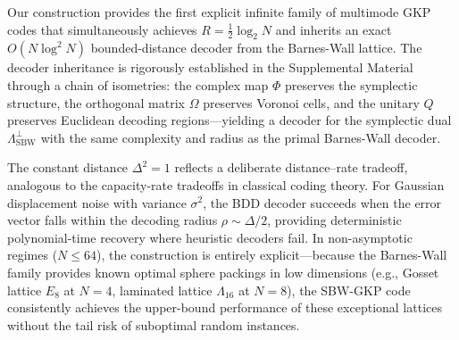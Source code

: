\documentclass[aps,prl,twocolumn,superscriptaddress]{revtex4-2}
\begin{document}
\begin{table}[t!]
\centering
\caption{Comparison of multimode GKP code families. The distance $\Delta^2$ is normalized such that $\Delta^2=1$ is the baseline GKP distance. $\Delta_{\max}^2$ denotes the asymptotic Minkowski capacity limit (Theorem~\ref{thm:minkowski}). $^\ast$For random constructions, bounded-distance decoding (BDD) restricts successful recovery to a vanishing fraction of the code distance~\cite{bloemer2026}.}
\label{tab:comparison}
\end{table}


Our construction provides the first explicit infinite family of multimode GKP codes that simultaneously achieves $R = \frac{1}{2}\log_2 N$ and inherits an exact $O(N\log^2 N)$ bounded-distance decoder from the Barnes-Wall lattice. The decoder inheritance is rigorously established in the Supplemental Material through a chain of isometries: the complex map $\Phi$ preserves the symplectic structure, the orthogonal matrix $\Omega$ preserves Voronoi cells, and the unitary $Q$ preserves Euclidean decoding regions---yielding a decoder for the symplectic dual $\Lambda_{\mathrm{SBW}}^\perp$ with the same complexity and radius as the primal Barnes-Wall decoder.

The constant distance $\Delta^2 = 1$ reflects a deliberate distance--rate tradeoff, analogous to the capacity-rate tradeoffs in classical coding theory. For Gaussian displacement noise with variance $\sigma^2$, the BDD decoder succeeds when the error vector falls within the decoding radius $\rho \sim \Delta/2$, providing deterministic polynomial-time recovery where heuristic decoders fail. In non-asymptotic regimes ($N \leq 64$), the construction is entirely explicit---because the Barnes-Wall family provides known optimal sphere packings in low dimensions (e.g., Gosset lattice $E_8$ at $N=4$,  laminated lattice $\Lambda_{16}$ at $N=8$), the SBW-GKP code consistently achieves the upper-bound performance of these exceptional lattices without the tail risk of suboptimal random instances.
\end{document}
